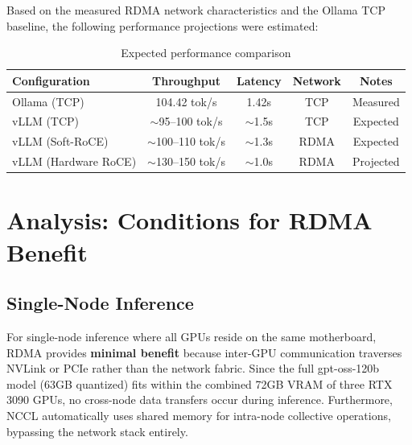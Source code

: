 \documentclass[10pt,letterpaper]{article}
\begin{document}
Based on the measured RDMA network characteristics and the Ollama TCP baseline, the following performance projections were estimated:

\begin{table}[H]
\centering
\small
\begin{tabular}{@{}lcccc@{}}
\toprule
\textbf{Configuration} & \textbf{Throughput} & \textbf{Latency} & \textbf{Network} & \textbf{Notes} \\
\midrule
Ollama (TCP) & 104.42 tok/s & 1.42s & TCP & Measured \\
vLLM (TCP) & $\sim$95--100 tok/s & $\sim$1.5s & TCP & Expected \\
vLLM (Soft-RoCE) & $\sim$100--110 tok/s & $\sim$1.3s & RDMA & Expected \\
vLLM (Hardware RoCE) & $\sim$130--150 tok/s & $\sim$1.0s & RDMA & Projected \\
\bottomrule
\end{tabular}
\caption{Expected performance comparison}
\end{table}

\section{Analysis: Conditions for RDMA Benefit}

\subsection{Single-Node Inference}

For single-node inference where all GPUs reside on the same motherboard, RDMA provides \textbf{minimal benefit} because inter-GPU communication traverses NVLink or PCIe rather than the network fabric. Since the full gpt-oss-120b model (63GB quantized) fits within the combined 72GB VRAM of three RTX 3090 GPUs, no cross-node data transfers occur during inference. Furthermore, NCCL \cite{nccl-docs} automatically uses shared memory for intra-node collective operations, bypassing the network stack entirely.
\end{document}
